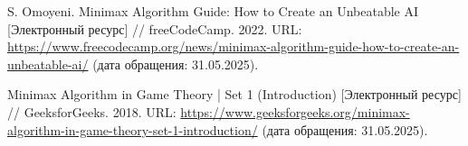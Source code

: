 \begin{thebibliography}{99}

S. Omoyeni. Minimax Algorithm Guide: How to Create an Unbeatable AI [Электронный ресурс] // freeCodeCamp. 2022. URL: \url{https://www.freecodecamp.org/news/minimax-algorithm-guide-how-to-create-an-unbeatable-ai/} (дата обращения: 31.05.2025).

Minimax Algorithm in Game Theory | Set 1 (Introduction) [Электронный ресурс] // GeeksforGeeks. 2018. URL: \url{https://www.geeksforgeeks.org/minimax-algorithm-in-game-theory-set-1-introduction/} (дата обращения: 31.05.2025).

\end{thebibliography}
